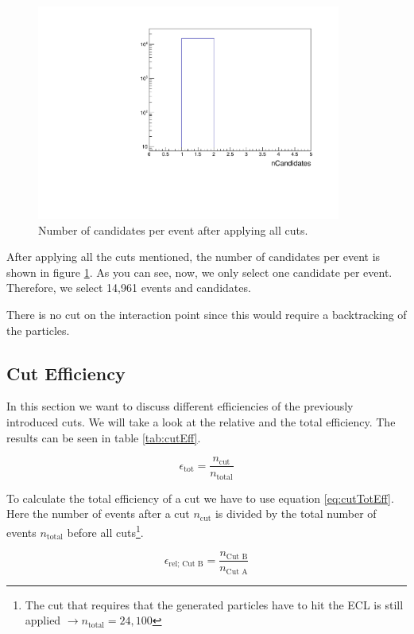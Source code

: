 \documentclass[a4paper,11pt,twosided,final,german,openbib,pdftex,listof=totoc,bibliography=totoc]{scrbook}
\begin{document}
\begin{figure}[h!]
	\centering
	\includegraphics[width=10cm]{Cuts/nCand.pdf}
	\caption[Number Of Candidates Per Event (All Cuts)]{Number of candidates per event after applying all cuts.}	
	\label{fig:nCand}
\end{figure}

After applying all the cuts mentioned, the number of candidates per event is shown in figure \ref{fig:nCand}. As you can see, now, we only select one candidate per event. Therefore, we select 14,961 events and candidates.

There is no cut on the interaction point since this would require a backtracking of the particles.




\subsection{Cut Efficiency}

In this section we want to discuss different efficiencies of the previously introduced cuts. We will take a look at the relative and the total efficiency. The results can be seen in table \ref{tab:cutEff}.

\begin{equation}
	\epsilon_{\textrm{tot}} = \frac{n_{\textrm{cut}}}{n_{\textrm{total}}}
	\label{eq:cutTotEff}
\end{equation}

To calculate the total efficiency of a cut we have to use equation \ref{eq:cutTotEff}. Here the number of events after a cut $n_{\textrm{cut}}$ is divided by the total number of events $n_{\textrm{total}}$ before all cuts\footnote{The cut that requires that the generated particles have to hit the ECL is still applied $\rightarrow n_{\textrm{total}} = 24,100$}.

\begin{equation}
	\epsilon_{\textrm{rel; Cut B}} = \frac{n_{\textrm{Cut B}}}{n_{\textrm{Cut A}}}
	\label{eq:cutRelEff}
\end{equation}
\end{document}
